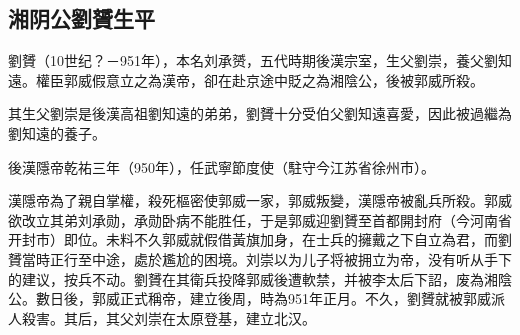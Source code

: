 \subsection{湘阴公劉贇生平}

劉贇（10世纪？－951年），本名刘承赟，五代時期後漢宗室，生父劉崇，養父劉知遠。權臣郭威假意立之為漢帝，卻在赴京途中貶之為湘陰公，後被郭威所殺。

其生父劉崇是後漢高祖劉知遠的弟弟，劉贇十分受伯父劉知遠喜愛，因此被過繼為劉知遠的養子。

後漢隱帝乾祐三年（950年），任武寧節度使（駐守今江苏省徐州市）。

漢隱帝為了親自掌權，殺死樞密使郭威一家，郭威叛變，漢隱帝被亂兵所殺。郭威欲改立其弟刘承勋，承勋卧病不能胜任，于是郭威迎劉贇至首都開封府（今河南省开封市）即位。未料不久郭威就假借黃旗加身，在士兵的擁戴之下自立為君，而劉贇當時正行至中途，處於尷尬的困境。刘崇以为儿子将被拥立为帝，没有听从手下的建议，按兵不动。劉贇在其衛兵投降郭威後遭軟禁，并被李太后下詔，废為湘陰公。數日後，郭威正式稱帝，建立後周，時為951年正月。不久，劉贇就被郭威派人殺害。其后，其父刘崇在太原登基，建立北汉。

